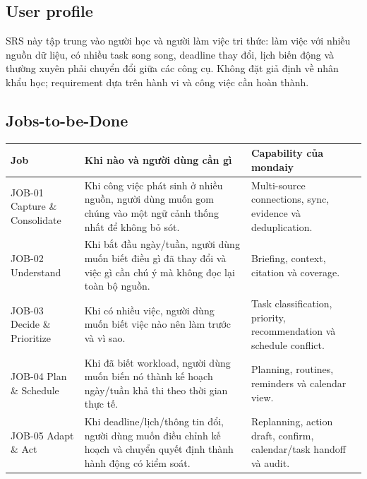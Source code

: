 \documentclass[12pt,a4paper]{article}
\begin{document}
\subsection{User profile}
SRS này tập trung vào người học và người làm việc tri thức: làm việc với nhiều
nguồn dữ liệu, có nhiều task song song, deadline thay đổi, lịch biến động và
thường xuyên phải chuyển đổi giữa các công cụ. Không đặt giả định về nhân khẩu
học; requirement dựa trên hành vi và công việc cần hoàn thành.

\subsection{Jobs-to-be-Done}
\begin{longtable}{p{3.6cm}p{5.1cm}p{5.3cm}}
\toprule Job & Khi nào và người dùng cần gì & Capability của mondaiy \\ \midrule
\endhead
JOB-01 Capture \& Consolidate & Khi công việc phát sinh ở nhiều nguồn, người dùng muốn gom chúng vào một ngữ cảnh thống nhất để không bỏ sót. & Multi-source connections, sync, evidence và deduplication. \\
JOB-02 Understand & Khi bắt đầu ngày/tuần, người dùng muốn biết điều gì đã thay đổi và việc gì cần chú ý mà không đọc lại toàn bộ nguồn. & Briefing, context, citation và coverage. \\
JOB-03 Decide \& Prioritize & Khi có nhiều việc, người dùng muốn biết việc nào nên làm trước và vì sao. & Task classification, priority, recommendation và schedule conflict. \\
JOB-04 Plan \& Schedule & Khi đã biết workload, người dùng muốn biến nó thành kế hoạch ngày/tuần khả thi theo thời gian thực tế. & Planning, routines, reminders và calendar view. \\
JOB-05 Adapt \& Act & Khi deadline/lịch/thông tin đổi, người dùng muốn điều chỉnh kế hoạch và chuyển quyết định thành hành động có kiểm soát. & Replanning, action draft, confirm, calendar/task handoff và audit. \\
\bottomrule
\end{longtable}
\end{document}
